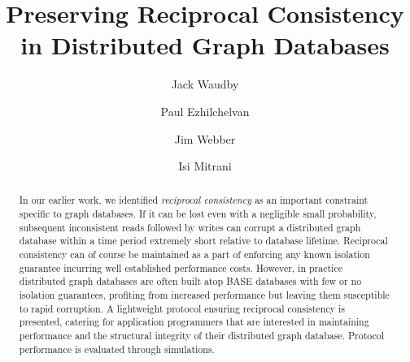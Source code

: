 \documentclass[sigplan,10pt]{acmart}
\begin{document}
\title{Preserving Reciprocal Consistency in Distributed Graph Databases}

\author{Jack Waudby}

\author{Paul Ezhilchelvan}

\author{Jim Webber}

\author{Isi Mitrani}

\renewcommand{\shortauthors}{Ezhilchelvan, et al.}

\begin{abstract}

In our earlier work, we identified \emph{reciprocal consistency} as an important constraint specific to graph databases. If it can be lost even with a negligible small probability, subsequent inconsistent reads followed by writes can corrupt a distributed graph database within a time period extremely short relative to database lifetime. Reciprocal consistency can of course be maintained as a part of enforcing any known isolation guarantee incurring well established performance costs. However, in practice distributed graph databases are often built atop BASE databases with few or no isolation guarantees, profiting from increased performance but leaving them susceptible to rapid corruption. A lightweight protocol ensuring reciprocal consistency is presented, catering for application programmers that are interested in maintaining performance and the structural integrity of their distributed graph database. Protocol performance is evaluated through simulations.
\end{abstract}
\end{document}
